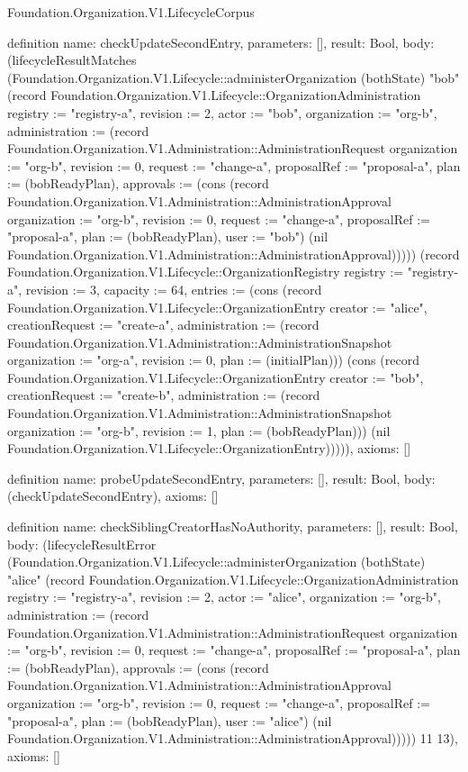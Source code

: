 \begin{lexlean}{Foundation.Organization.V1.LifecycleCorpus}
\begin{semanticmodule}
definition{
  name: checkUpdateSecondEntry,
  parameters: [],
  result: Bool,
  body: (lifecycleResultMatches (Foundation.Organization.V1.Lifecycle::administerOrganization (bothState) "bob" (record Foundation.Organization.V1.Lifecycle::OrganizationAdministration {registry := "registry-a", revision := 2, actor := "bob", organization := "org-b", administration := (record Foundation.Organization.V1.Administration::AdministrationRequest {organization := "org-b", revision := 0, request := "change-a", proposalRef := "proposal-a", plan := (bobReadyPlan), approvals := (cons (record Foundation.Organization.V1.Administration::AdministrationApproval {organization := "org-b", revision := 0, request := "change-a", proposalRef := "proposal-a", plan := (bobReadyPlan), user := "bob"}) (nil Foundation.Organization.V1.Administration::AdministrationApproval))})})) (record Foundation.Organization.V1.Lifecycle::OrganizationRegistry {registry := "registry-a", revision := 3, capacity := 64, entries := (cons (record Foundation.Organization.V1.Lifecycle::OrganizationEntry {creator := "alice", creationRequest := "create-a", administration := (record Foundation.Organization.V1.Administration::AdministrationSnapshot {organization := "org-a", revision := 0, plan := (initialPlan)})}) (cons (record Foundation.Organization.V1.Lifecycle::OrganizationEntry {creator := "bob", creationRequest := "create-b", administration := (record Foundation.Organization.V1.Administration::AdministrationSnapshot {organization := "org-b", revision := 1, plan := (bobReadyPlan)})}) (nil Foundation.Organization.V1.Lifecycle::OrganizationEntry)))})),
  axioms: []
}

definition{
  name: probeUpdateSecondEntry,
  parameters: [],
  result: Bool,
  body: (checkUpdateSecondEntry),
  axioms: []
}

definition{
  name: checkSiblingCreatorHasNoAuthority,
  parameters: [],
  result: Bool,
  body: (lifecycleResultError (Foundation.Organization.V1.Lifecycle::administerOrganization (bothState) "alice" (record Foundation.Organization.V1.Lifecycle::OrganizationAdministration {registry := "registry-a", revision := 2, actor := "alice", organization := "org-b", administration := (record Foundation.Organization.V1.Administration::AdministrationRequest {organization := "org-b", revision := 0, request := "change-a", proposalRef := "proposal-a", plan := (bobReadyPlan), approvals := (cons (record Foundation.Organization.V1.Administration::AdministrationApproval {organization := "org-b", revision := 0, request := "change-a", proposalRef := "proposal-a", plan := (bobReadyPlan), user := "alice"}) (nil Foundation.Organization.V1.Administration::AdministrationApproval))})})) 11 13),
  axioms: []
}


\end{semanticmodule}
\end{lexlean}
